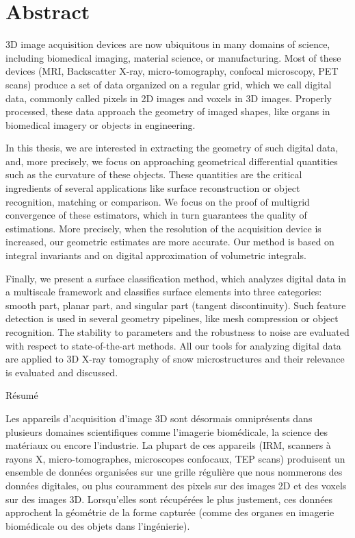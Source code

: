 %
\chapter*{Abstract}
\label{sec:abstract}
\vspace*{-10mm}

3D image acquisition devices are now ubiquitous in many domains of science,
including biomedical imaging, material science, or manufacturing. Most of these
devices (MRI, Backscatter X-ray, micro-tomography, confocal microscopy, PET scans)
produce a set of data organized on a regular grid, which we call digital data,
commonly called pixels in 2D images and voxels in 3D images. Properly processed,
these data approach the geometry of imaged shapes, like organs in biomedical
imagery or objects in engineering.

In this thesis, we are interested in extracting the geometry of such digital
data, and, more precisely, we focus on approaching geometrical differential
quantities such as the curvature of these objects. These quantities are the
critical ingredients of several applications like surface reconstruction or
object recognition, matching or comparison. We focus on the proof of multigrid
convergence of these estimators, which in turn guarantees the quality of
estimations. More precisely, when the resolution of the acquisition device is
increased, our geometric estimates are more accurate. Our method is based on
integral invariants and on digital approximation of volumetric integrals.

Finally, we present a surface classification method, which analyzes digital data
in a multiscale framework and classifies surface elements into three categories:
smooth part, planar part, and singular part (tangent discontinuity). Such
feature detection is used in several geometry pipelines, like mesh compression
or object recognition. The stability to parameters and the robustness to noise
are evaluated with respect to state-of-the-art methods. All our tools for
analyzing digital data are applied to 3D X-ray tomography of snow
microstructures and their relevance is evaluated and discussed.

\vspace*{20mm}

{Résumé}
\label{sec:abstract-french}
\vspace*{5mm}

Les appareils d'acquisition d'image 3D sont désormais omniprésents dans
plusieurs domaines scientifiques comme l'imagerie biomédicale, la science des
matériaux ou encore l'industrie. La plupart de ces appareils (IRM, scanners à
rayons X, micro-tomographes, microscopes confocaux, TEP scans) produisent un
ensemble de données organisées sur une grille régulière que nous nommerons des
données digitales, ou plus couramment des pixels sur des images 2D et des voxels
sur des images 3D. Lorsqu'elles sont récupérées le plus justement, ces données
approchent la géométrie de la forme capturée (comme des organes en imagerie
biomédicale ou des objets dans l'ingénierie).

